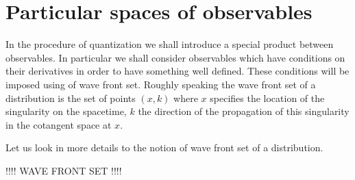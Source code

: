 \documentclass[10pt]{book}
\theoremstyle{break}
\begin{document}
\section{Particular spaces of observables}


In the procedure of quantization we shall introduce a special product between observables. In particular we shall consider observables which have conditions on their derivatives in order to have something well defined. These conditions will be imposed using of wave front set. Roughly speaking the wave front set of a distribution is the set of points $(x,k)$ where $x$ specifies the location of the singularity on the spacetime, $k$ the direction of the propagation of this singularity in the cotangent space at $x$.

\bigskip

Let us look in more details to the notion of wave front set of a distribution.


\bigskip


\begin{center}
!!!! WAVE FRONT SET !!!!
\end{center}



\bigskip
\end{document}
